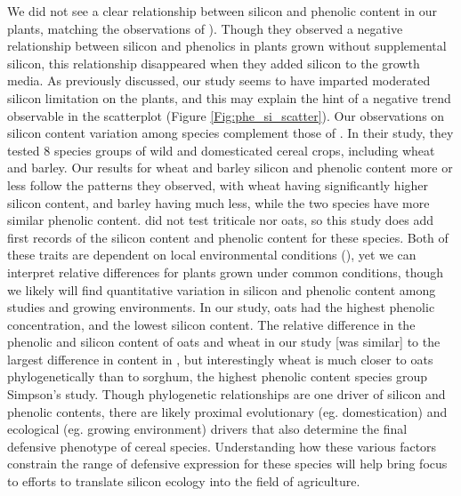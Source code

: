 \documentclass[12pt, letterpaper, ]{report}
\begin{document}
We did not see a clear relationship between silicon and phenolic content in our plants, matching the observations of \textcite{waterman_short-term_2021}). Though they observed a negative relationship between silicon and phenolics in plants grown without supplemental silicon, this relationship disappeared when they added silicon to the growth media. As previously discussed, our study seems to have imparted moderated silicon limitation on the plants, and this may explain the hint of a negative trend observable in the scatterplot (Figure \ref{Fig:phe_si_scatter}). Our observations on silicon content variation among species complement those of \textcite{simpson_still_2017}. In their study, they tested 8 species groups of wild and domesticated cereal crops, including wheat and barley. Our results for wheat and barley silicon and phenolic content more or less follow the patterns they observed, with wheat having significantly higher silicon content, and barley having much less, while the two species have more similar phenolic content. \textcite{simpson_still_2017} did not test triticale nor oats, so this study does add first records of the silicon content and phenolic content for these species. Both of these traits are dependent on local environmental conditions (\cite{quigley_soil_2020,schaller_silicon_2012}), yet we can interpret relative differences for plants grown under common conditions, though we likely will find quantitative variation in silicon and phenolic content among studies and growing environments. In our study, oats had the highest phenolic concentration, and the lowest silicon content. The relative difference in the phenolic and silicon content of oats and wheat in our study [was similar] to the largest difference in content in \textcite{simpson_still_2017}, but interestingly wheat is much closer to oats phylogenetically than to sorghum, the highest phenolic content species group Simpson's study. Though phylogenetic relationships are one driver of silicon and phenolic contents, there are likely proximal evolutionary (eg. domestication) and ecological (eg. growing environment) drivers that also determine the final defensive phenotype of cereal species. Understanding how these various factors constrain the range of defensive expression for these species will help bring focus to efforts to translate silicon ecology into the field of agriculture. 
\end{document}
